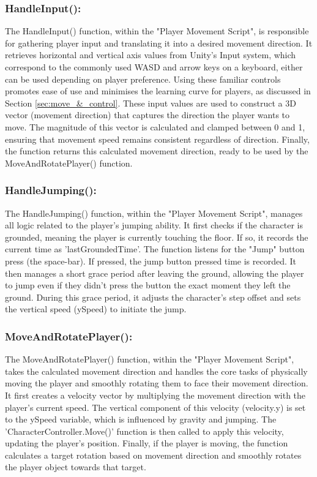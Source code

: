 \documentclass{l4proj}
\begin{document}
\subsubsection{HandleInput():}
The HandleInput() function, within the "Player Movement Script", is responsible for gathering player input and translating it into a desired movement direction. It retrieves horizontal and vertical axis values from Unity's Input system, which correspond to the commonly used WASD and arrow keys on a keyboard, either can be used depending on player preference. Using these familiar controls promotes ease of use and minimises the learning curve for players, as discussed in Section \ref{sec:move_&_control}. These input values are used to construct a 3D vector (movement direction) that captures the direction the player wants to move. The magnitude of this vector is calculated and clamped between 0 and 1, ensuring that movement speed remains consistent regardless of direction. Finally, the function returns this calculated movement direction, ready to be used by the MoveAndRotatePlayer() function.

\subsubsection{HandleJumping():}
The HandleJumping() function, within the "Player Movement Script", manages all logic related to the player's jumping ability. It first checks if the character is grounded, meaning the player is currently touching the floor. If so, it records the current time as 'lastGroundedTime'. The function listens for the "Jump" button press (the space-bar). If pressed, the jump button pressed time is recorded. It then manages a short grace period after leaving the ground, allowing the player to jump even if they didn't press the button the exact moment they left the ground. During this grace period, it adjusts the character's step offset and sets the vertical speed (ySpeed) to initiate the jump.

\subsubsection{MoveAndRotatePlayer():}
The MoveAndRotatePlayer() function, within the "Player Movement Script", takes the calculated movement direction and handles the core tasks of physically moving the player and smoothly rotating them to face their movement direction. It first creates a velocity vector by multiplying the movement direction with the player's current speed. The vertical component of this velocity (velocity.y) is set to the ySpeed variable, which is influenced by gravity and jumping. The 'CharacterController.Move()' function is then called to apply this velocity, updating the player's position. Finally, if the player is moving, the function calculates a target rotation based on movement direction and smoothly rotates the player object towards that target.
\end{document}

